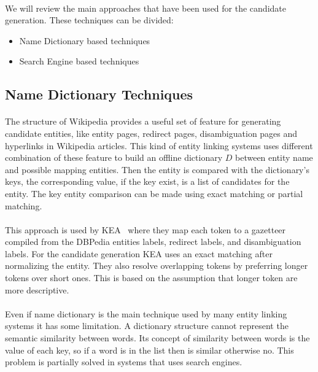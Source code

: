 \paragraph{}
We will review the main approaches that have been used for the candidate generation. These techniques can be divided:
\begin{itemize}[noitemsep,  topsep=10pt]
\item Name Dictionary based techniques
\item Search Engine based techniques
\end{itemize}

\subsection{Name Dictionary Techniques}
\paragraph{}
The structure of Wikipedia provides a useful set of feature for generating candidate entities, like entity pages, redirect pages, disambiguation pages and hyperlinks in Wikipedia articles. This kind of entity linking systems uses different combination of these feature to build an offline dictionary $D$ between entity name and possible mapping entities. Then the entity is compared with the dictionary's keys, the corresponding value, if the key exist, is a list of candidates for the entity. The key entity comparison can be made using exact matching or partial matching. 

\paragraph{}
This approach is used by KEA~\cite{waitelonisnamed} where they map each token to a gazetteer compiled from the DBPedia entities labels, redirect labels, and disambiguation labels. For the candidate generation KEA uses an exact matching  after normalizing the entity. They also resolve overlapping tokens by preferring longer tokens over short ones. This is based on the assumption that longer token are more descriptive.

\paragraph{}
Even if name dictionary is the main technique used by many entity linking systems it has some limitation. A dictionary structure cannot represent the semantic similarity between words. Its concept of similarity between words is the value of each key, so if a word is in the list then is similar otherwise no. This problem is partially solved in systems that uses search engines.

